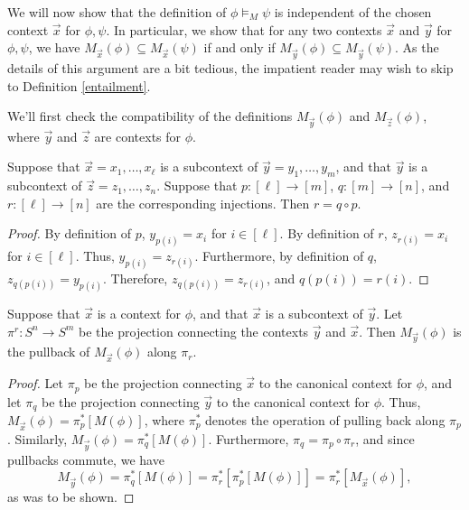 We will now show that the definition of $\phi\vDash _M\psi$ is
independent of the chosen context $\vec{x}$ for $\phi ,\psi$.  In
particular, we show that for any two contexts $\vec{x}$ and $\vec{y}$
for $\phi ,\psi$, we have
$M_{\vec{x}}(\phi )\subseteq M_{\vec{x}}(\psi )$ if and only if
$M_{\vec{y}}(\phi )\subseteq M_{\vec{y}}(\psi )$.  As the details of
this argument are a bit tedious, the impatient reader may wish to skip
to Definition \ref{entailment}.

We'll first check the compatibility of the definitions
$M_{\vec{y}}(\phi )$ and $M_{\vec{z}}(\phi )$, where $\vec{y}$ and
$\vec{z}$ are contexts for $\phi$.

\begin{lemma} Suppose that $\vec{x}=x_1,\dots ,x_\ell$ is a subcontext
  of $\vec{y}=y_1,\dots ,y_m$, and that $\vec{y}$ is a subcontext of
  $\vec{z}=z_1,\dots ,z_n$.  Suppose that $p:[\ell ]\to [m]$,
  $q:[m]\to [n]$, and $r:[\ell ]\to [n]$ are the corresponding
  injections.  Then $r=q\circ p$.  \end{lemma}

\begin{proof} By definition of $p$, $y_{p(i)}=x_i$ for $i\in [\ell ]$.
  By definition of $r$, $z_{r(i)}=x_i$ for $i\in [\ell ]$.  Thus,
  $y_{p(i)}=z_{r(i)}$.  Furthermore, by definition of $q$,
  $z_{q(p(i))}=y_{p(i)}$.  Therefore, $z_{q(p(i))}=z_{r(i)}$, and
  $q(p(i))=r(i)$.  \end{proof}

\begin{lemma} Suppose that $\vec{x}$ is a context for $\phi$, and that
  $\vec{x}$ is a subcontext of $\vec{y}$.  Let $\pi ^r:S^n\to S^m$ be
  the projection connecting the contexts $\vec{y}$ and $\vec{x}$.
  Then $M_{\vec{y}}(\phi )$ is the pullback of $M_{\vec{x}}(\phi )$
  along $\pi _r$. \label{rolig} \end{lemma}

\begin{proof} Let $\pi _p$ be the projection connecting $\vec{x}$ to
  the canonical context for $\phi$, and let $\pi _q$ be the projection
  connecting $\vec{y}$ to the canonical context for $\phi$.  Thus,
  $M_{\vec{x}}(\phi )=\pi _p^*[M(\phi )]$, where $\pi _p^*$ denotes
  the operation of pulling back along $\pi _p$.  Similarly,
  $M_{\vec{y}}(\phi )=\pi _q^*[M(\phi )]$.  Furthermore,
  $\pi _q=\pi _p\circ \pi _r$, and since pullbacks commute, we have
  \[ M_{\vec{y}}(\phi )=\pi _q^*[M(\phi )] = \pi _r^*[\pi _p^*[M(\phi
    )]] = \pi _r^*[M_{\vec{x}}(\phi )] ,\] as was to be
  shown. \end{proof}

